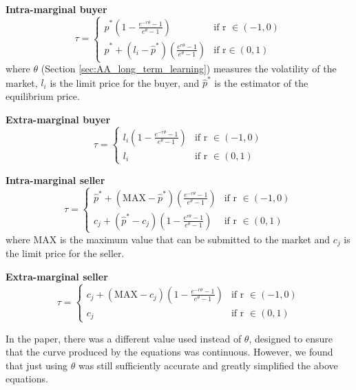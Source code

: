 \documentclass[preprint]{acm_proc_article-sp} %
\begin{document}
\textbf{Intra-marginal buyer}
\begin{equation}
    \tau =
    \begin{cases}
        \hat{p}^*(1- \frac{e^{-r\theta}-1}{e^{\theta}-1}) &  \text{if r } \in (-1,0)  \\
        \hat{p}^* + (l_i-\hat{p}^*)(\frac{e^{r\theta}-1}{e^\theta-1}) & \text{if r} \in (0,1)
    \end{cases}
    \label{eqn:intrabuyer}
\end{equation}
where $\theta$ (Section \ref{sec:AA_long_term_learning}) measures the volatility of the
market, $l_i$ is the limit price for the buyer, and $\hat{p}^*$ is the estimator of the
equilibrium price.

\textbf{Extra-marginal buyer}
\begin{equation}
    \tau =
    \begin{cases}
        l_i(1-\frac{e^{-r\theta}-1}{e^\theta-1}) &  \text{if r } \in (-1,0)  \\
        l_i & \text{if r } \in (0,1)
    \end{cases}
    \label{eqn:extrabuyer}
\end{equation}

\textbf{Intra-marginal seller}
\begin{equation}
    \tau =
    \begin{cases}
        \hat{p}^* + (\text{MAX}-\hat{p}^*)( \frac{e^{-r\theta}-1}{e^{\theta}-1}) &  \text{if r } \in (-1,0)  \\
        c_j + (\hat{p}^*-c_j)(1-\frac{e^{r\theta}-1}{e^\theta-1}) & \text{if r } \in (0,1)
    \end{cases}
    \label{eqn:intraseller}
\end{equation}
where MAX is the maximum value that can be submitted to the market and $c_j$ is
the limit price for the seller.

\textbf{Extra-marginal seller}
\begin{equation}
    \tau =
    \begin{cases}
        c_j + (\text{MAX}-c_j)(1-\frac{e^{-r\theta}-1}{e^\theta-1}) &  \text{if r } \in (-1,0)  \\
        c_j & \text{if r } \in (0,1)
    \end{cases}
    \label{eqn:extraseller}
\end{equation}

In the paper\cite{AA_thesis}, there was a different value used instead of $\theta$, designed to
ensure that the curve produced by the equations was continuous. However, we
found that just using $\theta$ was still sufficiently accurate and greatly
simplified the above equations.
\end{document}
